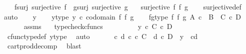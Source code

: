 \begin{isabellebody}
\ \ \ f{\isacharunderscore}{\kern0pt}surj{\isacharcolon}{\kern0pt}\ {\isachardoublequoteopen}surjective\ f{\isachardoublequoteclose}\ \ g{\isacharunderscore}{\kern0pt}surj{\isacharcolon}{\kern0pt}\ {\isachardoublequoteopen}surjective\ g{\isachardoublequoteclose}\isanewline
\ \ \ {\isachardoublequoteopen}surjective\ {\isacharparenleft}{\kern0pt}f\ {\isasymtimes}\isactrlsub f\ g{\isacharparenright}{\kern0pt}{\isachardoublequoteclose}\isanewline
%
\isadelimproof
\ \ %
\endisadelimproof
%
\isatagproof
{}\isamarkupfalse%
\ surjective{\isacharunderscore}{\kern0pt}def\isanewline
{}\isamarkupfalse%
{\isacharparenleft}{\kern0pt}auto{\isacharparenright}{\kern0pt}\isanewline
\ \ \isamarkupfalse%
\ y\isanewline
\ \ \isamarkupfalse%
\ y{\isacharunderscore}{\kern0pt}type{\isacharcolon}{\kern0pt}\ {\isachardoublequoteopen}y\ {\isasymin}\isactrlsub c\ codomain\ {\isacharparenleft}{\kern0pt}f\ {\isasymtimes}\isactrlsub f\ g{\isacharparenright}{\kern0pt}{\isachardoublequoteclose}\isanewline
\ \ \isamarkupfalse%
\ fg{\isacharunderscore}{\kern0pt}type{\isacharcolon}{\kern0pt}\ {\isachardoublequoteopen}f\ {\isasymtimes}\isactrlsub f\ g{\isacharcolon}{\kern0pt}\ A\ {\isasymtimes}\isactrlsub c\ \ B\ {\isasymrightarrow}\ C\ {\isasymtimes}\isactrlsub c\ D{\isachardoublequoteclose}\isanewline
\ \ \ \ \isamarkupfalse%
\ assms\ \ \isamarkupfalse%
\ typecheck{\isacharunderscore}{\kern0pt}cfuncs\ \ \ \ \isanewline
\ \ \isamarkupfalse%
\ \isamarkupfalse%
\ {\isachardoublequoteopen}y\ {\isasymin}\isactrlsub c\ C\ {\isasymtimes}\isactrlsub c\ D{\isachardoublequoteclose}\isanewline
\ \ \ \ \isamarkupfalse%
\ cfunc{\isacharunderscore}{\kern0pt}type{\isacharunderscore}{\kern0pt}def\ y{\isacharunderscore}{\kern0pt}type\ \isamarkupfalse%
\ auto\isanewline
\ \ \isamarkupfalse%
\ \isamarkupfalse%
\ {\isachardoublequoteopen}{\isasymexists}\ c\ d{\isachardot}{\kern0pt}\ c\ {\isasymin}\isactrlsub c\ C\ {\isasymand}\ d\ {\isasymin}\isactrlsub c\ D\ {\isasymand}\ y\ {\isacharequal}{\kern0pt}\ {\isasymlangle}c{\isacharcomma}{\kern0pt}d{\isasymrangle}{\isachardoublequoteclose}\isanewline
\ \ \ \ \isamarkupfalse%
\ cart{\isacharunderscore}{\kern0pt}prod{\isacharunderscore}{\kern0pt}decomp\ \isamarkupfalse%
\ blast\isanewline
\ \ \isamarkupfalse%
\ \isamarkupfalse%

\end{isabellebody}
